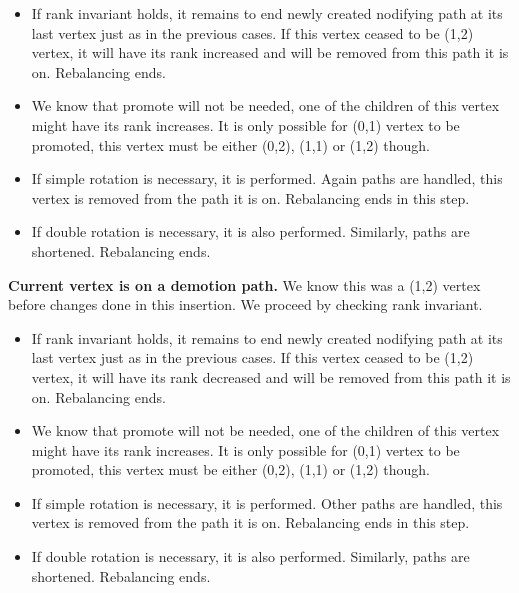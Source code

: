 \begin{itemize}

\item If rank invariant holds, it remains to end newly created nodifying path at its last vertex just as in the previous cases. If this vertex ceased to be (1,2) vertex, it will have its rank increased and will be removed from this path it is on. Rebalancing ends.

\item We know that promote will not be needed, one of the children of this vertex might have its rank increases. It is only possible for (0,1) vertex to be promoted, this vertex must be either (0,2), (1,1) or (1,2) though.

\item If simple rotation is necessary, it is performed. Again paths are handled, this vertex is removed from the path it is on. Rebalancing ends in this step.

\item If double rotation is necessary, it is also performed. Similarly, paths are shortened. Rebalancing ends.

\end{itemize}

\textbf{Current vertex is on a demotion path.} We know this was a (1,2) vertex before changes done in this insertion. We proceed by checking rank invariant. 

\begin{itemize}

\item If rank invariant holds, it remains to end newly created nodifying path at its last vertex just as in the previous cases. If this vertex ceased to be (1,2) vertex, it will have its rank decreased and will be removed from this path it is on. Rebalancing ends.

\item We know that promote will not be needed, one of the children of this vertex might have its rank increases. It is only possible for (0,1) vertex to be promoted, this vertex must be either (0,2), (1,1) or (1,2) though.

\item If simple rotation is necessary, it is performed. Other paths are handled, this vertex is removed from the path it is on. Rebalancing ends in this step.

\item If double rotation is necessary, it is also performed. Similarly, paths are shortened. Rebalancing ends.

\end{itemize}

